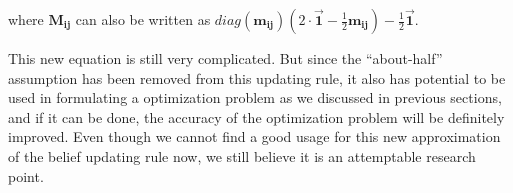 where $\mathbf{M_{ij}}$ can also be written as
$diag(\mathbf{m_{ij}})(2\cdot \vec{\mathbf{1}}-\frac{1}{2}\mathbf{m_{ij}})-\frac{1}{2}\vec{\mathbf{1}}$.

This new equation is still very complicated. But since the ``about-half'' assumption has been removed from this updating rule, it also has potential to be used in formulating a optimization problem as we discussed in previous sections, and if it can be done, the accuracy of the optimization problem will be definitely improved. Even though we cannot find a good usage for this new approximation of the belief updating rule now, we still believe it is an attemptable research point.

